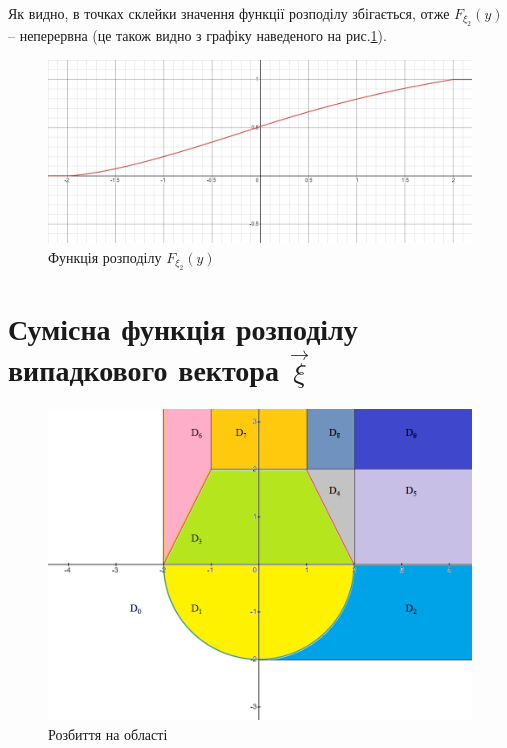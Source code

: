 \documentclass[14pt, a4paper, ukrainian]{extreport}
\begin{document}
		Як видно, в точках склейки значення функції розподілу збігається, отже $F_{\xi_2}(y)$ -- неперервна (це також видно з графіку наведеного на рис.\ref{im:F2}).
		
		\begin{figure}[H]
			\centering
			\includegraphics[width=\textwidth]{./Image/Im_09_F2.png}
			\caption{Функція розподілу $F_{\xi_2}(y)$}
			\label{im:F2}
		\end{figure}
	
	
	\section{Сумісна функція розподілу випадкового вектора $\vec\xi$}
	
	\begin{figure}[H]
		\centering
		\includegraphics[width=\textwidth]{./Image/Im_10_D.png}
		\caption{Розбиття на області}
		\label{im:D}
	\end{figure}
\end{document}
